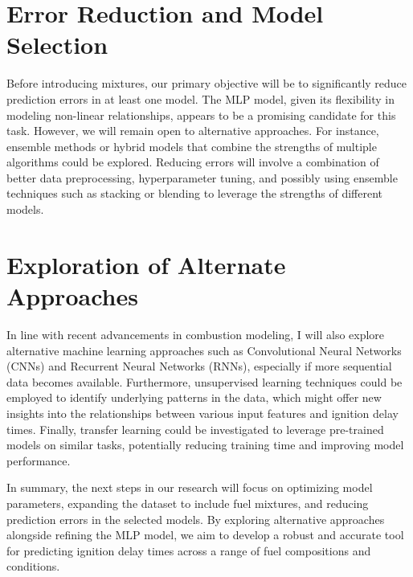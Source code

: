 \documentclass[12pt]{report}
\begin{document}
\section{Error Reduction and Model Selection}

Before introducing mixtures, our primary objective will be to significantly reduce prediction errors in at least one model. The MLP model, given its flexibility in modeling non-linear relationships, appears to be a promising candidate for this task. However, we will remain open to alternative approaches. For instance, ensemble methods or hybrid models that combine the strengths of multiple algorithms could be explored. Reducing errors will involve a combination of better data preprocessing, hyperparameter tuning, and possibly using ensemble techniques such as stacking or blending to leverage the strengths of different models.

\section{Exploration of Alternate Approaches}

In line with recent advancements in combustion modeling, I will also explore alternative machine learning approaches such as Convolutional Neural Networks (CNNs) and Recurrent Neural Networks (RNNs), especially if more sequential data becomes available. Furthermore, unsupervised learning techniques could be employed to identify underlying patterns in the data, which might offer new insights into the relationships between various input features and ignition delay times. Finally, transfer learning could be investigated to leverage pre-trained models on similar tasks, potentially reducing training time and improving model performance.

In summary, the next steps in our research will focus on optimizing model parameters, expanding the dataset to include fuel mixtures, and reducing prediction errors in the selected models. By exploring alternative approaches alongside refining the MLP model, we aim to develop a robust and accurate tool for predicting ignition delay times across a range of fuel compositions and conditions.





\newpage
\end{document}
